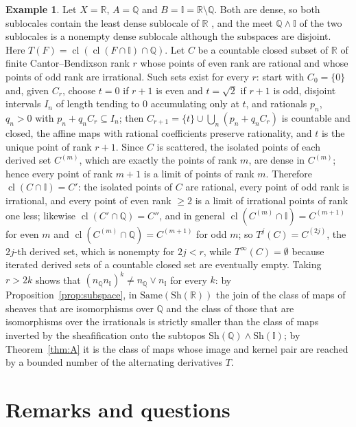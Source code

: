 \documentclass[11pt]{amsart}
\theoremstyle{definition}
\newtheorem{ex}[thm]{Example}
\newcommand{\Same}{\mathrm{Same}}
\newcommand{\Sh}{\mathrm{Sh}}
\begin{document}
\begin{ex}\label{ex:QI}
Let $X=\mathbb R$, $A=\mathbb Q$ and $B=\mathbb I=\mathbb R\setminus\mathbb Q$.
Both are dense, so both sublocales contain the least dense sublocale of
$\mathbb R$ \cite[II.2]{StoneSpaces}, and the meet $\mathbb Q\wedge\mathbb I$
of the two sublocales is a nonempty dense sublocale although the subspaces
are disjoint. Here $T(F)=\operatorname{cl}(\operatorname{cl}(F\cap\mathbb I)
\cap\mathbb Q)$. Let $C$ be a countable closed subset of $\mathbb R$ of
finite Cantor--Bendixson rank $r$ whose points of even rank are rational
and whose points of odd rank are irrational. Such sets exist for every $r$:
start with $C_0=\{0\}$ and, given $C_{r}$, choose $t=0$ if $r+1$ is even
and $t=\sqrt2$ if $r+1$ is odd, disjoint intervals $I_n$ of length tending
to $0$ accumulating only at $t$, and rationals $p_n$, $q_n>0$ with
$p_n+q_nC_r\subseteq I_n$; then $C_{r+1}=\{t\}\cup\bigcup_n(p_n+q_nC_r)$ is
countable and closed, the affine maps with rational coefficients preserve
rationality, and $t$ is the unique point of rank $r+1$. Since $C$ is
scattered, the isolated points of each derived set $C^{(m)}$, which are
exactly the points of rank $m$, are dense in $C^{(m)}$; hence every point
of rank $m+1$ is a limit of points of rank $m$. Therefore
$\operatorname{cl}(C\cap\mathbb I)=C'$: the isolated points of $C$ are
rational, every point of odd rank is irrational, and every point of even
rank $\ge2$ is a limit of irrational points of rank one less; likewise
$\operatorname{cl}(C'\cap\mathbb Q)=C''$, and in general
$\operatorname{cl}(C^{(m)}\cap\mathbb I)=C^{(m+1)}$ for even $m$ and
$\operatorname{cl}(C^{(m)}\cap\mathbb Q)=C^{(m+1)}$ for odd $m$; so
$T^j(C)=C^{(2j)}$, the $2j$-th derived set, which is nonempty for $2j<r$,
while $T^\infty(C)=\emptyset$ because iterated derived sets of a countable
closed set are eventually empty. Taking $r>2k$ shows that $(n_{\mathbb Q}
n_{\mathbb I})^k\ne n_{\mathbb Q}\vee n_{\mathbb I}$ for every $k$: by
Proposition~\ref{prop:subspace}, in $\Same(\Sh(\mathbb R))$ the join of the
class of maps of sheaves that are isomorphisms over $\mathbb Q$ and the
class of those that are isomorphisms over the irrationals is strictly
smaller than the class of maps inverted by the sheafification onto the
subtopos $\Sh(\mathbb Q)\wedge\Sh(\mathbb I)$; by Theorem~\ref{thm:A} it is
the class of maps whose image and kernel pair are reached by a bounded
number of the alternating derivatives $T$.
\end{ex}

\section{Remarks and questions}\label{sec:rem}
\end{document}

